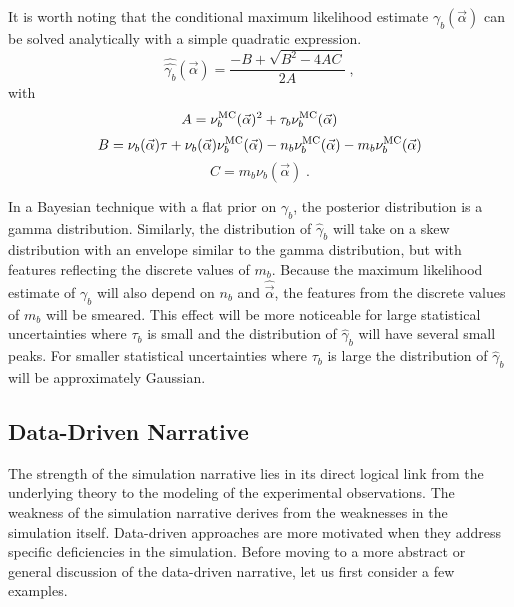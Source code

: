 It is worth noting that the conditional maximum likelihood estimate $\hat{\hat{\gamma_b}}(\vec\alpha)$ can be solved analytically with a simple quadratic expression.
\begin{equation}
\hat{\hat{\gamma_b}}(\vec\alpha) = \frac{-B + \sqrt{B^2 - 4 AC}}{2A} \;,
\end{equation}
with
\begin{equation}
A =  \nu_b^{\rm MC}(\vec\alpha)^2 + \tau_b  \nu_b^{\rm MC}(\vec\alpha)
\end{equation}
\begin{equation}
B= \nu_b(\vec\alpha) \tau +  \nu_b(\vec\alpha) \nu_b^{\rm MC}(\vec\alpha) - n_b  \nu_b^{\rm MC}(\vec\alpha) - m_b  \nu_b^{\rm MC}(\vec\alpha)
\end{equation}
\begin{equation}
C= m_b \nu_b(\vec\alpha) \;.
\end{equation}


In a Bayesian technique with a flat prior on $\gamma_b$, the posterior distribution is a gamma distribution.  Similarly, the distribution of $\hat\gamma_b$ will take on a skew distribution with an envelope similar to the gamma distribution, but with features reflecting the discrete values of $m_b$.  Because the maximum likelihood estimate of $\gamma_b$ will also depend on $n_b$ and $\hat{\vec\alpha}$, the  features from the discrete values of $m_b$ will be smeared.  This effect will be more noticeable for large statistical uncertainties where $\tau_b$ is small and the distribution  of $\hat\gamma_b$  will have several small peaks.  For smaller statistical uncertainties where $\tau_b$ is large the distribution of $\hat\gamma_b$ will be approximately Gaussian.


\subsection{Data-Driven Narrative}


The strength of the simulation narrative lies in its direct logical link from the underlying theory to the modeling of the experimental observations.  The weakness of the simulation narrative derives from the weaknesses in the simulation itself.  Data-driven approaches are more motivated when they address specific deficiencies in the simulation.  Before moving to a more abstract or general discussion of the data-driven narrative, let us first consider a few examples.


